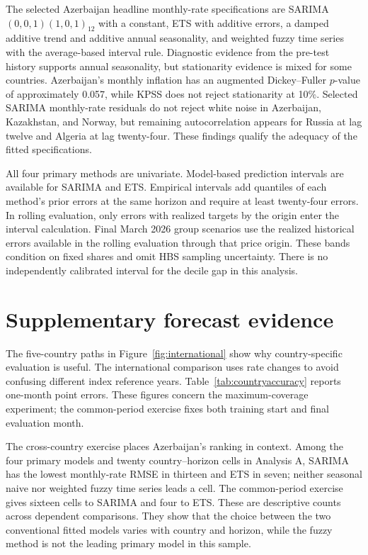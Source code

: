 \documentclass[11pt,a4paper]{article}
\begin{document}
The selected Azerbaijan headline monthly-rate specifications are SARIMA$(0,0,1)(1,0,1)_{12}$ with a constant, ETS with additive errors, a damped additive trend and additive annual seasonality, and weighted fuzzy time series with the average-based interval rule. Diagnostic evidence from the pre-test history supports annual seasonality, but stationarity evidence is mixed for some countries. Azerbaijan's monthly inflation has an augmented Dickey--Fuller $p$-value of approximately 0.057, while KPSS does not reject stationarity at 10\%. Selected SARIMA monthly-rate residuals do not reject white noise in Azerbaijan, Kazakhstan, and Norway, but remaining autocorrelation appears for Russia at lag twelve and Algeria at lag twenty-four. These findings qualify the adequacy of the fitted specifications.

All four primary methods are univariate. Model-based prediction intervals are available for SARIMA and ETS. Empirical intervals add quantiles of each method's prior errors at the same horizon and require at least twenty-four errors. In rolling evaluation, only errors with realized targets by the origin enter the interval calculation. Final March 2026 group scenarios use the realized historical errors available in the rolling evaluation through that price origin. These bands condition on fixed shares and omit HBS sampling uncertainty. There is no independently calibrated interval for the decile gap in this analysis.

\section{Supplementary forecast evidence}
\label{app:forecast}

The five-country paths in Figure~\ref{fig:international} show why country-specific evaluation is useful. The international comparison uses rate changes to avoid confusing different index reference years. Table~\ref{tab:countryaccuracy} reports one-month point errors. These figures concern the maximum-coverage experiment; the common-period exercise fixes both training start and final evaluation month.


The cross-country exercise places Azerbaijan's ranking in context. Among the four primary models and twenty country--horizon cells in Analysis A, SARIMA has the lowest monthly-rate RMSE in thirteen and ETS in seven; neither seasonal naive nor weighted fuzzy time series leads a cell. The common-period exercise gives sixteen cells to SARIMA and four to ETS. These are descriptive counts across dependent comparisons. They show that the choice between the two conventional fitted models varies with country and horizon, while the fuzzy method is not the leading primary model in this sample.
\end{document}
